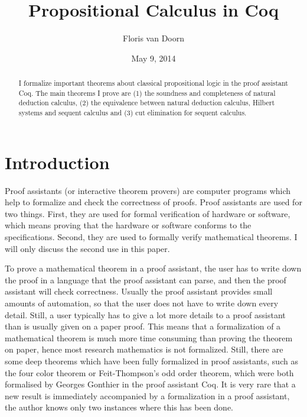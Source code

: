 \documentclass{article}
\date{May 9, 2014}
\begin{document}
\title{Propositional Calculus in Coq}
\author{Floris van Doorn}
\maketitle

\begin{abstract}
    I formalize important theorems about classical propositional logic in the proof assistant Coq. The main theorems I prove are (1) the soundness and completeness of natural deduction calculus, (2) the equivalence between natural deduction calculus, Hilbert systems and sequent calculus and (3) cut elimination for sequent calculus.
\end{abstract}

\section{Introduction}\label{sec_intro}
Proof assistants (or interactive theorem provers) are computer programs which help to formalize and check the correctness of proofs. Proof assistants are used for two things. First, they are used for formal verification of hardware or software, which means proving that the hardware or software conforms to the specifications. Second, they are used to formally verify mathematical theorems. I will only discuss the second use in this paper.

To prove a mathematical theorem in a proof assistant, the user has to write down the proof in a language that the proof assistant can parse, and then the proof assistant will check correctness. Usually the proof assistant provides small amounts of automation, so that the user does not have to write down every detail. Still, a user typically has to give a lot more details to a proof assistant than is usually given on a paper proof. This means that a formalization of a mathematical theorem is much more time consuming than proving the theorem on paper, hence most research mathematics is not formalized. Still, there are some deep theorems which have been fully formalized in proof assistants, such as the four color theorem\citep{gonthier2005fourcolour} or Feit-Thompson's odd order theorem\citep{Gonthier2013Feit}, which were both formalised by Georges Gonthier in the proof assistant Coq. It is very rare that a new result is immediately accompanied by a formalization in a proof assistant, the author knows only two instances where this has been done.\citep{siles2012pure,vandoorn2013}
\end{document}
